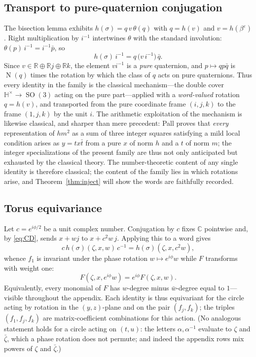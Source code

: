 \documentclass[11pt]{article}
\theoremstyle{definition}
\theoremstyle{remark}
\newcommand{\HH}{\mathbb{H}}
\newcommand{\RR}{\mathbb{R}}
\newcommand{\CC}{\mathbb{C}}
\newcommand{\bz}{\bar{\zeta}}
\newcommand{\bw}{\bar{w}}
\DeclareMathOperator{\SO}{SO}
\DeclareMathOperator{\N}{N}
\begin{document}
\subsection{Transport to pure-quaternion conjugation}
The bisection lemma exhibits $h(\sigma)=q\,v\,\theta(q)$ with $q=h(v)$ and $v=h(\beta^{\varepsilon})$. Right multiplication by $i^{-1}$ intertwines $\theta$ with the standard involution: $\theta(p)\,i^{-1} = i^{-1}\bar p$, so
\[
h(\sigma)\,i^{-1}=q\,\bigl(v\,i^{-1}\bigr)\,\bar q .
\]
Since $v\in\RR\oplus\RR j\oplus\RR k$, the element $vi^{-1}$ is a \emph{pure} quaternion, and $p\mapsto qp\bar q$ is $\N(q)$ times the rotation by which the class of $q$ acts on pure quaternions. Thus every identity in the family is the classical mechanism---the double cover $\HH^\times\to\SO(3)$ acting on the pure part---applied with a \emph{word-valued} rotation $q=h(v)$, and transported from the pure coordinate frame $(i,j,k)$ to the frame $(1,j,k)$ by the unit $i$. The arithmetic exploitation of the mechanism is likewise classical, and sharper than mere precedent: Pall \cite[\S8]{Pall} proves that \emph{every} representation of $hm^2$ as a sum of three integer squares satisfying a mild local condition arises as $y=tx\bar t$ from a pure $x$ of norm $h$ and a $t$ of norm $m$; the integer specializations of the present family are thus not only anticipated but exhausted by the classical theory. The number-theoretic content of any single identity is therefore classical; the content of the family lies in which rotations arise, and Theorem~\ref{thm:inject} will show the words are faithfully recorded.

\subsection{Torus equivariance}
Let $c=e^{i\phi/2}$ be a unit complex number. Conjugation by $c$ fixes $\CC$ pointwise and, by \eqref{eq:CD}, sends $x+wj$ to $x+c^2w\,j$. Applying this to a word gives
\[
c\,h(\sigma)(\zeta,x,w)\,c^{-1}=h(\sigma)(\zeta,x,c^{2}w),
\]
whence $f_1$ is invariant under the phase rotation $w\mapsto e^{i\phi}w$ while $F$ transforms with weight one:
\[
F(\zeta,x,e^{i\phi}w)=e^{i\phi}F(\zeta,x,w).
\]
Equivalently, every monomial of $F$ has $w$-degree minus $\bw$-degree equal to $1$---visible throughout the appendix. Each identity is thus equivariant for the circle acting by rotation in the $(y,z)$-plane and on the pair $(f_j,f_k)$; the triples $(f_1,f_j,f_k)$ are matrix-coefficient combinations for this action. (No analogous statement holds for a circle acting on $(t,u)$: the letters $\alpha,\alpha^{-1}$ evaluate to $\zeta$ and $\bz$, which a phase rotation does not permute; and indeed the appendix rows mix powers of $\zeta$ and $\bz$.)
\end{document}
